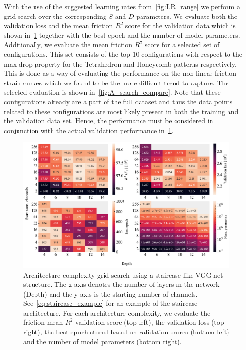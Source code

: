 With the use of the suggested learning rates from~\cref{fig:LR_range} we perform
a grid search over the corresponding $S$ and $D$ parameters. We evaluate both
the validation loss and the mean friction $R^2$ score for the validation data which is shown in~\cref{fig:A_search_perf} together with the best epoch and the number of model parameters. Additionally, we evaluate the mean friction $R^2$ score for a selected set of configurations. This set consists of the top 10 configurations with respect to the max drop property for the Tetrahedron and Honeycomb patterns respectively. This is done as a way of evaluating the performance on the non-linear friction-strain curves which we found to be the more difficult trend to capture. The selected evaluation is shown in~\cref{fig:A_search_compare}. Note that these configurations already are a part of the full dataset and thus the data points related to these configurations are most likely present in both the training and the validation data set. Hence, the performance must be considered in conjunction with the actual validation performance in~\cref{fig:A_search_perf}.

\begin{figure}[!htb]
  \centering
  \includegraphics[width=0.88\linewidth]{figures/ML/A_search_perf.pdf}
  \caption{Architecture complexity grid search using a staircase-like VGG-net structure. The x-axis denotes the number of layers in the network (Depth) and the y-axis is the starting number of channels. See~\cref{eq:staircase_example} for an example of the staircase architecture. For each architecture complexity, we evaluate the friction mean $R^2$ validation score (top left), the validation loss (top right), the best epoch stored based on validation scores (bottom left) and the number of model parameters (bottom right).}
  \label{fig:A_search_perf}
\end{figure}  

